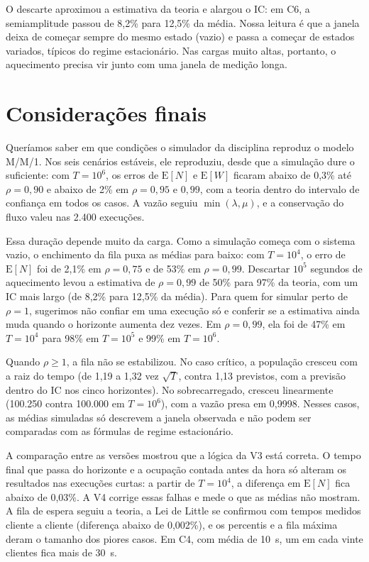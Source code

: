 \documentclass[
  article,      %
  10pt,         %
  oneside,
  a4paper,
  twocolumn,    %
  english,
  brazil        %
]{abntex2}
\newcommand{\EN}{\mathrm{E}[N]}
\newcommand{\EW}{\mathrm{E}[W]}
\begin{document}
O descarte aproximou a estimativa da teoria e alargou o IC: em C6, a semiamplitude passou de 8,2\% para 12,5\% da média. Nossa leitura é que a janela deixa de começar sempre do mesmo estado (vazio) e passa a começar de estados variados, típicos do regime estacionário. Nas cargas muito altas, portanto, o aquecimento precisa vir junto com uma janela de medição longa.


\section{Considerações finais}

Queríamos saber em que condições o simulador da disciplina reproduz o modelo M/M/1. Nos seis cenários estáveis, ele reproduziu, desde que a simulação dure o suficiente: com $T=10^6$, os erros de $\EN$ e $\EW$ ficaram abaixo de 0,3\% até $\rho=0{,}90$ e abaixo de 2\% em $\rho=0{,}95$ e $0{,}99$, com a teoria dentro do intervalo de confiança em todos os casos. A vazão seguiu $\min(\lambda,\mu)$, e a conservação do fluxo valeu nas 2.400 execuções.

Essa duração depende muito da carga. Como a simulação começa com o sistema vazio, o enchimento da fila puxa as médias para baixo: com $T=10^4$, o erro de $\EN$ foi de 2,1\% em $\rho=0{,}75$ e de 53\% em $\rho=0{,}99$. Descartar $10^5$ segundos de aquecimento levou a estimativa de $\rho=0{,}99$ de 50\% para 97\% da teoria, com um IC mais largo (de 8,2\% para 12,5\% da média). Para quem for simular perto de $\rho=1$, sugerimos não confiar em uma execução só e conferir se a estimativa ainda muda quando o horizonte aumenta dez vezes. Em $\rho=0{,}99$, ela foi de 47\% em $T=10^4$ para 98\% em $T=10^5$ e 99\% em $T=10^6$.

Quando $\rho\geq1$, a fila não se estabilizou. No caso crítico, a população cresceu com a raiz do tempo (de 1,19 a 1,32 vez $\sqrt{T}$, contra 1,13 previstos, com a previsão dentro do IC nos cinco horizontes). No sobrecarregado, cresceu linearmente (100.250 contra 100.000 em $T=10^6$), com a vazão presa em 0,9998. Nesses casos, as médias simuladas só descrevem a janela observada e não podem ser comparadas com as fórmulas de regime estacionário.

A comparação entre as versões mostrou que a lógica da V3 está correta. O tempo final que passa do horizonte e a ocupação contada antes da hora só alteram os resultados nas execuções curtas: a partir de $T=10^4$, a diferença em $\EN$ fica abaixo de 0,03\%. A V4 corrige essas falhas e mede o que as médias não mostram. A fila de espera seguiu a teoria, a Lei de Little se confirmou com tempos medidos cliente a cliente (diferença abaixo de 0,002\%), e os percentis e a fila máxima deram o tamanho dos piores casos. Em C4, com média de 10~s, um em cada vinte clientes fica mais de 30~s.
\end{document}
